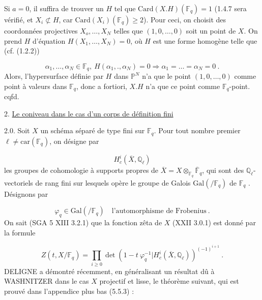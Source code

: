Si $a = 0$, il suffira de trouver un $H$ tel que $\mathrm{Card}(X.H)(\mathbb{F}_q)=1$ (1.4.7 sera vérifié, et $X_i \not\subset H$, car $\mathrm{Card}(X_i)(\mathbb{F}_q) \geq 2$). Pour ceci, on choisit des coordonnées projectives $X_o,\dots,X_N$ telles que $(1,0,\dots,0)$ soit un point de $X$. On prend $H$ d'équation $H(X_1,\dots,X_N) = 0$, où $H$ est une forme homogène telle que (cf. (1.2.2))

\begin{equation}\tag{1.4.8}
\alpha_1,\dots,\alpha_N \in \mathbb{F}_q, \ H(\alpha_1,.,\alpha_N) = 0 \Longrightarrow \alpha_1=\dots=\alpha_N = 0 \ .
\end{equation}
Alors, l'hypersurface définie par $H$ dans $\mathbb{P}^N$ n'a que le point $(1,0,\dots,0)$ comme point à valeurs dans $\mathbb{F}_q$, donc a fortiori, $X.H$ n'a que ce point comme $\mathbb{F}_q$-point. cqfd.




2. \underline{Le coniveau dans le cas d'un corps de définition fini}

2.0. Soit $X$ un schéma séparé de type fini sur $\mathbb{F}_q$. Pour tout nombre premier $\ell \neq \mathrm{car}(\mathbb{F}_q)$, on désigne par

\begin{equation}\tag{2.0.1}
H^i_c(\overline{X},\mathbb{Q}_\ell)
\end{equation}
les groupes de cohomologie à supports propres de $\overline{X} = X \otimes_{\mathbb{F}_q} \overline{\mathbb{F}}_q$, qui sont des $\mathbb{Q}_\ell$-vectoriels de rang fini sur lesquels opère le groupe de Galois $\mathrm{Gal}(/\mathbb{F}_q)$ de $\mathbb{F}_q$ . Désignons par

\begin{equation}\tag{2.0.2}
\varphi_q \in \mathrm{Gal}(/\mathbb{F}_q) \quad \mbox{l'automorphisme de Frobenius} \ .
\end{equation}
On sait (SGA 5 XIII 3.2.1) que la fonction zêta de $X$ (XXII 3.0.1) est donné par la formule

\begin{equation}\tag{2.0.3}
Z(t,X/\mathbb{F}_q) = \prod_{i \geq 0} \det (1-t\ \varphi_q^{-1}|H^i_c(\overline{X},\mathbb{Q}_\ell))^{(-1)^{i+1}} \ .
\end{equation}
DELIGNE a démontré récemment, en généralisant un résultat dû à WASHNITZER dans le cas $X$ projectif et lisse, le théorème suivant, qui est prouvé dans l'appendice plus bas (5.5.3) :

